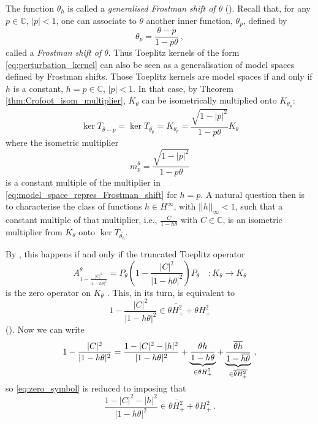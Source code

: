 \documentclass{article}
\numberwithin{equation}{section}
\theoremstyle{plain}
\newcommand{\Hp}{\ensuremath{H^2_+}}
\newcommand{\Hinf}{\ensuremath{H^\infty}}
\newcommand{\CC}{\ensuremath{\mathbb{C}}}
\newcommand{\ol}[1]{\ensuremath{\overline{#1}}}
\newcommand{\annot}[2]{\underbrace{#1}_{\smash[b]{\scriptstyle #2}}}
\begin{document}
The function $\theta_h$ is called a \emph{generalised Frostman shift of $\theta$} (\cite{CaCarRoss24}).
Recall that, for any $p\in\CC$, $|p|<1$, one can associate to $\theta$ another inner function, $\theta_p$, defined by
\begin{equation}
\theta_p = \frac{\theta - \ol p}{1 - p \theta} \ ,
\end{equation}
called a {\em Frostman shift of $\theta$}.
Thus Toeplitz kernels of the form \eqref{eq:perturbation_kernel} can also be seen as a generalisation of model spaces defined by Frostman shifts.
Those Toeplitz kernels are model spaces if and only if $h$ is a constant, $h=p \in\CC$, $|p|<1$.
In that case, by Theorem \ref{thm:Crofoot_isom_multiplier}, $K_\theta$ can be isometrically multiplied onto $K_{\theta_p}$:
\begin{equation}
\ker T_{\ol\theta -p} = \ker T_{\ol{\theta_p}} = K_{\theta_p} = \frac{\sqrt{1 - |p|^2}}{1-p\theta} K_\theta
\end{equation}
where the isometric multiplier
\begin{equation}
m_p^\theta = \frac{\sqrt{1 - |p|^2}}{1-p\theta}
\end{equation}
is a constant multiple of the multiplier in \eqref{eq:model_space_repres_Frostman_shift} for $h=p$.
A natural question then is to characterise the class of functions $h\in\Hinf$, with $||h||_\infty <1$, such that a constant multiple of that multiplier, i.e., $\frac{C}{1-h\theta}$ with $C\in\CC$, is an isometric multiplier from $K_\theta$ onto $\ker T_{\ol{\theta_h}}$.


By \cite[Proposition 5.8]{CaCarRoss24}, this happens if and only if the truncated Toeplitz operator
\begin{equation}
A^\theta_{1-\frac{|C|^2}{|1-h\theta|^2}}  = P_\theta \left( 1-\frac{|C|^2}{|1-h\theta|^2} \right) P_\theta \quad : K_\theta \to K_\theta
\end{equation}
is the zero operator on $K_\theta$ .
This, in its turn, is equivalent to
\begin{equation}
\label{eq:zero_symbol}
1-\frac{|C|^2}{|1-h\theta|^2} \in \ol{\theta\Hp} + \theta \Hp
\end{equation}
(\cite{Sa07}).
Now we can write
\begin{equation}
1-\frac{|C|^2}{|1-h\theta|^2} = \frac{1 - |C|^2 - |h|^2}{|1-h\theta|^2} + 
\annot{\frac{\theta h}{1-h\theta}}{\in \theta \Hp} + 
\annot{\frac{\ol\theta \ol h}{1-\ol h \ol\theta}}{\in\ol\theta \ol\Hp}\ ,
\end{equation}
so \eqref{eq:zero_symbol} is reduced to imposing that
\begin{equation}
\label{eq:Frostman_shift_mult_isometric_condition}
\frac{1 - |C|^2 - |h|^2}{|1-h\theta|^2} \in \ol{\theta\Hp} + \theta \Hp\ .
\end{equation}
\end{document}
